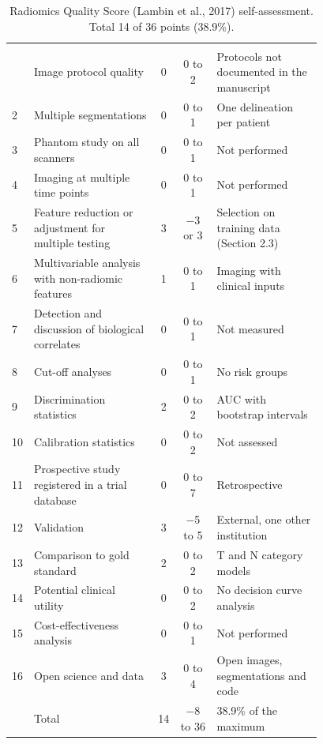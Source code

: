 \begin{longtable}{@{}L{0.04\linewidth}L{0.40\linewidth}ccL{0.34\linewidth}@{}}
\caption{Radiomics Quality Score (Lambin et al., 2017) self-assessment. Total 14 of 36 points (38.9\%).}\label{tab:rqs}\\
\toprule
{} &  &  &  &  \\
\midrule
\endfirsthead
\toprule
{} &  &  &  &  \\
\midrule
\endhead
\botrule
{} & Image protocol quality & 0 & 0 to 2 & Protocols not documented in the manuscript \\
2 & Multiple segmentations & 0 & 0 to 1 & One delineation per patient \\
3 & Phantom study on all scanners & 0 & 0 to 1 & Not performed \\
4 & Imaging at multiple time points & 0 & 0 to 1 & Not performed \\
5 & Feature reduction or adjustment for multiple testing & 3 & $-$3 or 3 & Selection on training data (Section 2.3) \\
6 & Multivariable analysis with non-radiomic features & 1 & 0 to 1 & Imaging with clinical inputs \\
7 & Detection and discussion of biological correlates & 0 & 0 to 1 & Not measured \\
8 & Cut-off analyses & 0 & 0 to 1 & No risk groups \\
9 & Discrimination statistics & 2 & 0 to 2 & AUC with bootstrap intervals \\
10 & Calibration statistics & 0 & 0 to 2 & Not assessed \\
11 & Prospective study registered in a trial database & 0 & 0 to 7 & Retrospective \\
12 & Validation & 3 & $-$5 to 5 & External, one other institution \\
13 & Comparison to gold standard & 2 & 0 to 2 & T and N category models \\
14 & Potential clinical utility & 0 & 0 to 2 & No decision curve analysis \\
15 & Cost-effectiveness analysis & 0 & 0 to 1 & Not performed \\
16 & Open science and data & 3 & 0 to 4 & Open images, segmentations and code \\
\midrule
 & Total & 14 & $-$8 to 36 & 38.9\% of the maximum \\
\end{longtable}
